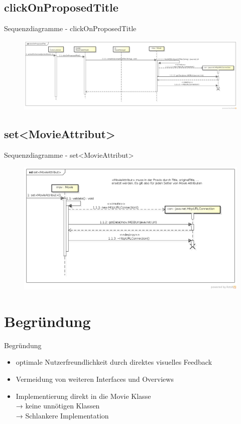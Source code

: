 \documentclass{beamer} %
\begin{document}
	\subsection{clickOnProposedTitle}
	\begin{frame}{Sequenzdiagramme - clickOnProposedTitle}
		\begin{figure}[H] %
			\centering
			\includegraphics[width=\linewidth]{clickOnProposedTitle.png}
		\end{figure}
	\end{frame}

	\subsection{set<MovieAttribut>}
	\begin{frame}{Sequenzdiagramme - set<MovieAttribut>}
		\begin{figure}[H] %
			\centering
			\includegraphics[width=\linewidth]{set_MovieAttribut_.png}
		\end{figure}
	\end{frame}

	\section{Begründung}
	\begin{frame}{Begründung}
		\begin{itemize}
			\item optimale Nutzerfreundlichkeit durch direktes visuelles Feedback
			\item Vermeidung von weiteren Interfaces und Overviews
			\item Implementierung direkt in die Movie Klasse\\
				→ keine unnötigen Klassen\\
				→ Schlankere Implementation
		\end{itemize}
	\end{frame}

	\section{}
	\begin{frame}
	\end{frame}
\end{document}
